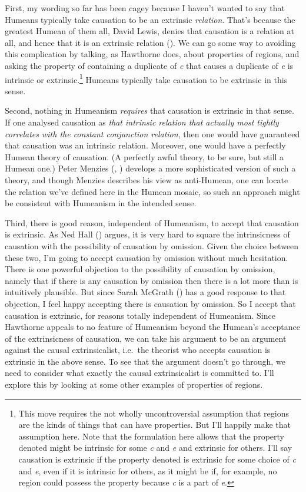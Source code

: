 \documentclass[
  10pt,
  letterpaper,
  DIV=11,
  numbers=noendperiod,
  twoside]{scrartcl}
\begin{document}
First, my wording so far has been cagey because I haven't wanted to say
that Humeans typically take causation to be an extrinsic
\emph{relation}. That's because the greatest Humean of them all, David
Lewis, denies that causation is a relation at all, and hence that it is
an extrinsic relation (). We can
go some way to avoiding this complication by talking, as Hawthorne does,
about properties of regions, and asking the property of containing a
duplicate of \emph{c} that causes a duplicate of \emph{e} is intrinsic
or extrinsic.\footnote{This move requires the not wholly uncontroversial
  assumption that regions are the kinds of things that can have
  properties. But I'll happily make that assumption here. Note that the
  formulation here allows that the property denoted might be intrinsic
  for some \emph{c} and \emph{e} and extrinsic for others. I'll say
  causation is extrinsic if the property denoted is extrinsic for some
  choice of \emph{c} and \emph{e}, even if it is intrinsic for others,
  as it might be if, for example, no region could possess the property
  because \emph{c} is a part of \emph{e}.} Humeans typically take
causation to be extrinsic in this sense.

Second, nothing in Humeanism \emph{requires} that causation is extrinsic
in that sense. If one analysed causation as \emph{that intrinsic
relation that actually most tightly correlates with the constant
conjunction relation}, then one would have guaranteed that causation was
an intrinsic relation. Moreover, one would have a perfectly Humean
theory of causation. (A perfectly awful theory, to be sure, but still a
Humean one.) Peter Menzies (,
) develops a more sophisticated version
of such a theory, and though Menzies describes his view as anti-Humean,
one can locate the relation we've defined here in the Humean mosaic, so
such an approach might be consistent with Humeanism in the intended
sense.

Third, there is good reason, independent of Humeanism, to accept that
causation is extrinsic. As Ned Hall ()
argues, it is very hard to square the intrinsicness of causation with
the possibility of causation by omission. Given the choice between these
two, I'm going to accept causation by omission without much hesitation.
There is one powerful objection to the possibility of causation by
omission, namely that if there is any causation by omission then there
is a lot more than is intuitively plausible. But since Sarah McGrath
() has a good response to that
objection, I feel happy accepting there is causation by omission. So I
accept that causation is extrinsic, for reasons totally independent of
Humeanism. Since Hawthorne appeals to no feature of Humeanism beyond the
Humean's acceptance of the extrinsicness of causation, we can take his
argument to be an argument against the causal extrinsicalist, i.e.~the
theorist who accepts causation is extrinsic in the above sense. To see
that the argument doesn't go through, we need to consider what exactly
the causal extrinsicalist is committed to. I'll explore this by looking
at some other examples of properties of regions.
\end{document}
